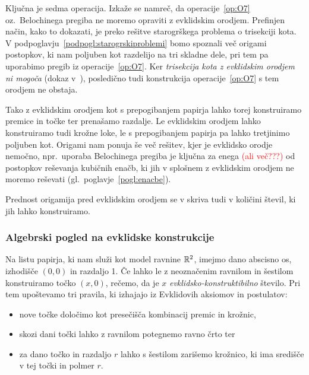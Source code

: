 Ključna je sedma operacija. Izkaže se namreč, da operacije~\ref{op:O7} oz.\ Belochinega pregiba ne moremo opraviti z evklidskim orodjem. Prefinjen način, kako to dokazati, je preko rešitve starogrškega problema o trisekciji kota. V podpoglavju~\ref{podpogl:starogrskiproblemi} bomo spoznali več origami postopkov, ki nam poljuben kot razdelijo na tri skladne dele, pri tem pa uporabimo pregib iz operacije~\ref{op:O7}. Ker \emph{trisekcija kota z evklidskim orodjem ni mogoča} (dokaz v~\cite[str.\ 77--78]{jerman1998}), posledično tudi konstrukcija operacije~\ref{op:O7} s tem orodjem ne obstaja.

Tako z evklidskim orodjem kot s prepogibanjem papirja lahko torej konstruiramo premice in točke ter prenašamo razdalje. Le evklidskim orodjem lahko konstruiramo tudi krožne loke, le s prepogibanjem papirja pa lahko tretjinimo poljuben kot. Origami nam ponuja še več rešitev, kjer je evklidsko orodje nemočno, npr.\ uporaba Belochinega pregiba je ključna za enega \textcolor{red}{(ali več???)} od postopkov reševanja kubičnih enačb, ki jih v splošnem z evklidskim orodjem ne moremo reševati (gl.\ poglavje~\ref{pogl:enacbe}).

Prednost origamija pred evklidskim orodjem se v skriva tudi v količini števil, ki jih lahko konstruiramo.

\subsubsection{Algebrski pogled na evklidske konstrukcije}
\label{podpogl:evkl_konstruktibilnost}

\begin{definicija}
    Na listu papirja, ki nam služi kot model ravnine $\mathbb R^2$, imejmo dano abscisno os, izhodišče $(0,0)$ in razdaljo 1. Če lahko le z neoznačenim ravnilom in šestilom konstruiramo točko $(x,0)$, rečemo, da je $x$ \emph{evklidsko-konstruktibilno} število. Pri tem upoštevamo tri pravila, ki izhajajo iz Evklidovih aksiomov in postulatov:
    \begin{itemize}
        \item nove točke določimo kot presečišča kombinacij premic in krožnic,
        \item skozi dani točki lahko z ravnilom potegnemo ravno črto ter
        \item za dano točko in razdaljo $r$ lahko s šestilom zarišemo krožnico, ki ima središče v tej točki in polmer $r$.
    \end{itemize}
\end{definicija}

